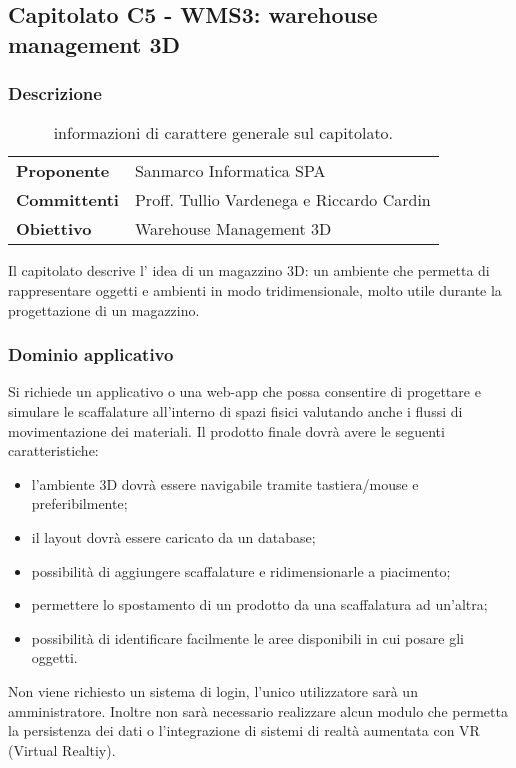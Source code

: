 \subsection{Capitolato C5 - WMS3: warehouse management 3D} \label{sec:c5}
	\subsubsection{Descrizione}
	
		\begin{table}[H]
			\begin{tabularx}{\textwidth}{p{3cm}|X}
				\toprule
				\textbf{Proponente} & Sanmarco Informatica SPA
				\\
				\textbf{Committenti} & Proff. Tullio Vardenega e Riccardo Cardin
				\\
				\textbf{Obiettivo} & Warehouse Management 3D
				\\\toprule
			\end{tabularx}
			\caption{informazioni di carattere generale sul capitolato.}
		\end{table}
		
		Il capitolato descrive l’ idea di un magazzino 3D: un ambiente che permetta di rappresentare oggetti e ambienti in modo tridimensionale, molto utile durante la	progettazione di un magazzino.
		
	\subsubsection{Dominio applicativo}
		Si richiede un applicativo o una web-app che possa consentire di progettare e simulare le scaffalature all’interno di spazi fisici valutando anche i flussi di movimentazione dei materiali.
		Il prodotto finale dovrà avere le seguenti caratteristiche:
		\begin{itemize}
			\item l’ambiente 3D dovrà essere navigabile tramite tastiera/mouse e preferibilmente;
			\item il layout dovrà essere caricato da un database;
			\item possibilità di aggiungere scaffalature e ridimensionarle a piacimento;
			\item permettere lo spostamento di un prodotto da una scaffalatura ad un’altra;
			\item possibilità di identificare facilmente le aree disponibili in cui posare gli oggetti.
		\end{itemize}
		Non viene richiesto un sistema di login, l’unico utilizzatore sarà un amministratore.
		Inoltre non sarà necessario realizzare alcun modulo che permetta la persistenza dei
		dati o l’integrazione di sistemi di realtà aumentata con VR (Virtual Realtiy).

